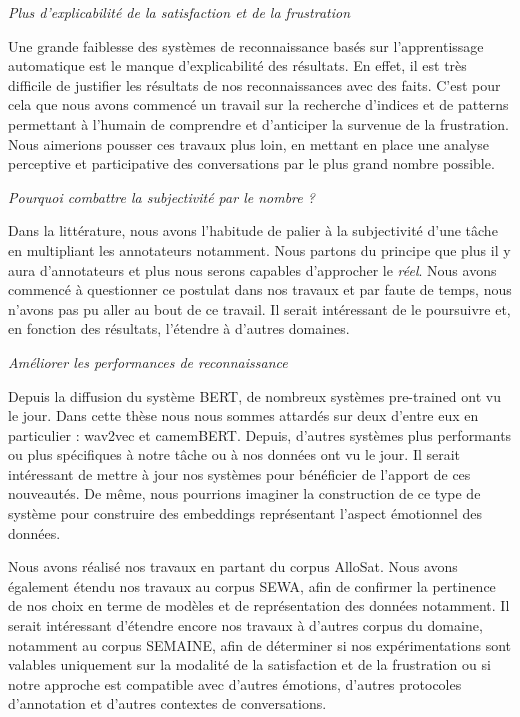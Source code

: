 \vspace{1cm}

\textit{Plus d'explicabilité de la satisfaction et de la frustration}

Une grande faiblesse des systèmes de reconnaissance basés sur l'apprentissage automatique est le manque d'explicabilité des résultats. En effet, il est très difficile de justifier les résultats de nos reconnaissances avec des faits. C'est pour cela que nous avons commencé un travail sur la recherche d'indices et de patterns permettant à l'humain de comprendre et d'anticiper la survenue de la frustration. Nous aimerions pousser ces travaux plus loin, en mettant en place une analyse perceptive et participative des conversations par le plus grand nombre possible.

\vspace{1cm}

\textit{Pourquoi combattre la subjectivité par le nombre ?}

Dans la littérature, nous avons l'habitude de palier à la subjectivité d'une tâche en multipliant les annotateurs notamment. Nous partons du principe que plus il y aura d'annotateurs et plus nous serons capables d'approcher le \textit{réel}. Nous avons commencé à questionner ce postulat dans nos travaux et par faute de temps, nous n'avons pas pu aller au bout de ce travail. Il serait intéressant de le poursuivre et, en fonction des résultats, l'étendre à d'autres domaines.

\vspace{1cm}

\textit{Améliorer les performances de reconnaissance}

Depuis la diffusion du système BERT, de nombreux systèmes pre-trained ont vu le jour. Dans cette thèse nous nous sommes attardés sur deux d'entre eux en particulier : wav2vec et camemBERT. Depuis, d'autres systèmes plus performants ou plus spécifiques à notre tâche ou à nos données ont vu le jour. Il serait intéressant de mettre à jour nos systèmes pour bénéficier de l'apport de ces nouveautés.
De même, nous pourrions imaginer la construction de ce type de système pour construire des embeddings représentant l'aspect émotionnel des données.

Nous avons réalisé nos travaux en partant du corpus AlloSat. Nous avons également étendu nos travaux au corpus SEWA, afin de confirmer la pertinence de nos choix en terme de modèles et de représentation des données notamment. Il serait intéressant d'étendre encore nos travaux à d'autres corpus du domaine, notamment au corpus SEMAINE, afin de déterminer si nos expérimentations sont valables uniquement sur la modalité de la satisfaction et de la frustration ou si notre approche est compatible avec d'autres émotions, d'autres protocoles d'annotation et d'autres contextes de conversations.

